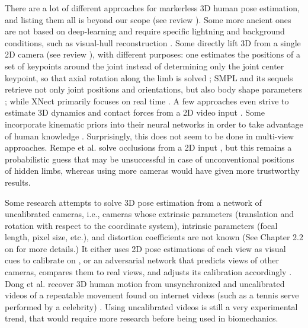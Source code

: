 There are a lot of different approaches for markerless 3D human pose estimation, and listing them all is beyond our scope (see review \cite{Wang2021a}). Some more ancient ones are not based on deep-learning and require specific lightning and background conditions, such as visual-hull reconstruction \cite{Ceseracciu2014}. Some directly lift 3D from a single 2D camera (see review \cite{Liu2022b}), with different purposes: one estimates the positions of a set of keypoints around the joint instead of determining only the joint center keypoint, so that axial rotation along the limb is solved \cite{Fisch2020}; SMPL and its sequels retrieve not only joint positions and orientations, but also body shape parameters \cite{Loper2015}; while XNect primarily focuses on real time \cite{Mehta2020}. A few approaches even strive to estimate 3D dynamics and contact forces from a 2D video input \cite{Li2019,Rempe2021,Louis2022}. Some incorporate kinematic priors into their neural networks in order to take advantage of human knowledge \cite{Xu2020}. Surprisingly, this does not seem to be done in multi-view approaches. Rempe et al. solve occlusions from a 2D input \cite{Rempe2020}, but this remains a probabilistic guess that may be unsuccessful in case of unconventional positions of hidden limbs, whereas using more cameras would have given more trustworthy results. 

Some research attempts to solve 3D pose estimation from a network of uncalibrated cameras, i.e., cameras whose extrinsic parameters (translation and rotation with respect to the coordinate system), intrinsic parameters (focal length, pixel size, etc.), and distortion coefficients are not known (See Chapter 2.2 on  for more details.) It either uses 2D pose estimations of each view as visual cues to calibrate on \cite{Takahashi2018, Xu2021, Liu2022a}, or an adversarial network that predicts views of other cameras, compares them to real views, and adjusts its calibration accordingly \cite{Ershadi-Nasab2021}. Dong et al. recover 3D human motion from unsynchronized and uncalibrated videos of a repeatable movement found on internet videos (such as a tennis serve performed by a celebrity) \cite{Dong2020}. Using uncalibrated videos is still a very experimental trend, that would require more research before being used in biomechanics.

